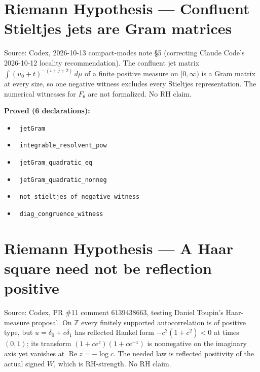 \documentclass{report}
\theoremstyle{definition}
\begin{document}
\section{Riemann Hypothesis --- Confluent Stieltjes jets are Gram matrices}
Source: Codex, 2026-10-13 compact-modes note \S5 (correcting Claude Code's 2026-10-12 locality recommendation). The confluent jet matrix $\int (u_0+t)^{-(i+j+2)}\,d\mu$ of a finite positive measure on $[0,\infty)$ is a Gram matrix at every size, so one negative witness excludes every Stieltjes representation. The numerical witnesses for $F_\theta$ are not formalized. No RH claim.

\noindent\textbf{Proved (6 declarations):}
\begin{itemize}
  \item {}\leanok\ \texttt{jetGram}
  \item {}\leanok\ \texttt{integrable\_resolvent\_pow}
  \item {}\leanok\ \texttt{jetGram\_quadratic\_eq}
  \item {}\leanok\ \texttt{jetGram\_quadratic\_nonneg}
  \item {}\leanok\ \texttt{not\_stieltjes\_of\_negative\_witness}
  \item {}\leanok\ \texttt{diag\_congruence\_witness}
\end{itemize}

\section{Riemann Hypothesis --- A Haar square need not be reflection positive}
Source: Codex, PR \#11 comment 6139438663, testing Daniel Toupin's Haar-measure proposal. On $\mathbb{Z}$ every finitely supported autocorrelation is of positive type, but $u=\delta_0+c\delta_1$ has reflected Hankel form $-c^2(1+c^2)<0$ at times $(0,1)$; its transform $(1+ce^{z})(1+ce^{-z})$ is nonnegative on the imaginary axis yet vanishes at $\operatorname{Re}z=-\log c$. The needed law is reflected positivity of the actual signed $W$, which is RH-strength. No RH claim.
\end{document}
